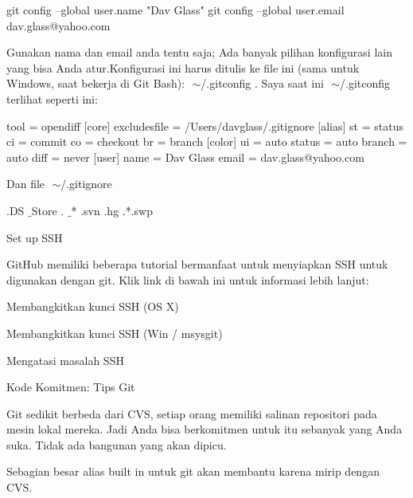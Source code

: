 \vspace{12pt}
\noindent 
 git config --global user.name "Dav Glass" git config --global user.email dav.glass@yahoo.com  \par
\vspace{12pt}
\noindent 
Gunakan nama dan email anda tentu saja; $  $Ada $  $banyak pilihan konfigurasi lain $  $yang bisa Anda atur.Konfigurasi ini harus ditulis ke file ini (sama untuk Windows, saat bekerja di Git Bash): $  $ $  \sim  $/.gitconfig $  $. $  $Saya saat ini $  $ $  \sim  $/.gitconfig $  $terlihat seperti ini: \par
\vspace{12pt}
\noindent 
 [merge] tool = opendiff [core] excludesfile = /Users/davglass/.gitignore [alias] st = status ci = commit co = checkout br = branch [color] ui = auto status = auto branch = auto diff = never [user] name = Dav Glass email = dav.glass@yahoo.com  \par
\vspace{12pt}
\noindent 
Dan file $  $ $  \sim  $/.gitignore \par
\noindent 
 .DS $  \_  $Store . $  \_  $* .svn .hg .*.swp  \par
\noindent 
 $  $Set up SSH \par
\noindent 
GitHub memiliki beberapa tutorial bermanfaat untuk menyiapkan SSH untuk digunakan dengan git. $  $Klik link di bawah ini untuk informasi lebih lanjut: \par
\vspace{12pt}
\noindent 
Membangkitkan kunci SSH (OS X) \par
\vspace{12pt}
\noindent 
Membangkitkan kunci SSH (Win / msysgit) \par
\vspace{12pt}
\noindent 
Mengatasi masalah SSH \par
\vspace{12pt}
\noindent 
 $  $Kode Komitmen: Tips Git \par
\vspace{12pt}
\noindent 
Git sedikit berbeda dari CVS, setiap orang memiliki salinan repositori pada mesin lokal mereka. $  $Jadi Anda bisa berkomitmen untuk itu sebanyak yang Anda suka. $  $Tidak ada bangunan yang akan dipicu. \par
\vspace{12pt}
\noindent 
Sebagian besar alias built in untuk git akan membantu karena mirip dengan CVS. \par
\vspace{12pt}
